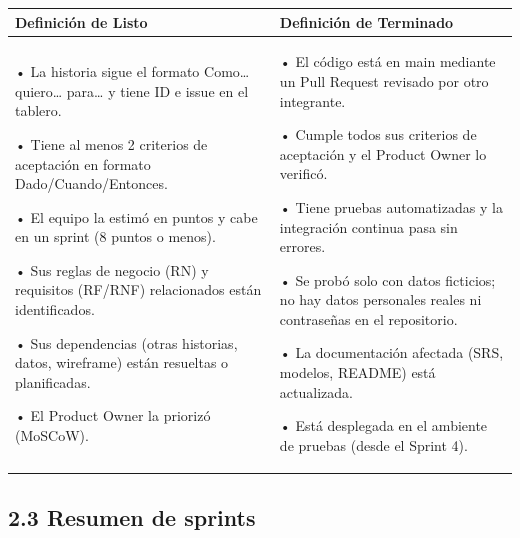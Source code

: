 {\def\LTcaptype{none} %
\begin{longtable}[]{@{}
  >{\raggedright\arraybackslash}p{}
  >{\raggedright\arraybackslash}p{}@{}}
\toprule\noalign{}
\begin{minipage}[b]{\linewidth}\raggedright
\textbf{Definición de Listo}
\end{minipage} & \begin{minipage}[b]{\linewidth}\raggedright
\textbf{Definición de Terminado}
\end{minipage} \\
\midrule\noalign{}
\endhead
\bottomrule\noalign{}
\endlastfoot
• La historia sigue el formato Como\ldots{} quiero\ldots{} para\ldots{}
y tiene ID e issue en el tablero.

• Tiene al menos 2 criterios de aceptación en formato
Dado/Cuando/Entonces.

• El equipo la estimó en puntos y cabe en un sprint (8 puntos o menos).

• Sus reglas de negocio (RN) y requisitos (RF/RNF) relacionados están
identificados.

• Sus dependencias (otras historias, datos, wireframe) están resueltas o
planificadas.

• El Product Owner la priorizó (MoSCoW). & • El código está en main
mediante un Pull Request revisado por otro integrante.

• Cumple todos sus criterios de aceptación y el Product Owner lo
verificó.

• Tiene pruebas automatizadas y la integración continua pasa sin
errores.

• Se probó solo con datos ficticios; no hay datos personales reales ni
contraseñas en el repositorio.

• La documentación afectada (SRS, modelos, README) está actualizada.

• Está desplegada en el ambiente de pruebas (desde el Sprint 4). \\
\end{longtable}
}

\subsection{2.3 Resumen de sprints}\label{resumen-de-sprints}

